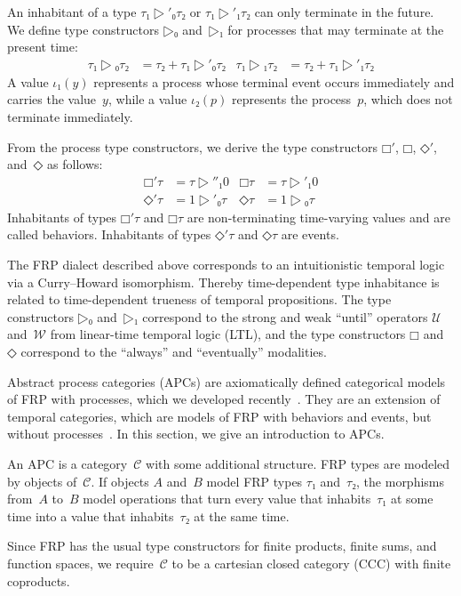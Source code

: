 \documentclass[copyright,creativecommons]{eptcs}
\begin{document}
An inhabitant of a type $τ₁ ▷′₀ τ₂$ or $τ₁ ▷′₁ τ₂$ can only terminate in the
future. We define type constructors $▷₀$ and~$▷₁$ for processes that may
terminate at the present time:
\begin{align}
τ₁ ▷₀ τ₂ & = τ₂ + τ₁ ▷′₀ τ₂ & τ₁ ▷₁ τ₂ & = τ₂ + τ₁ ▷′₁ τ₂
\end{align}
A value $ι₁(y)$ represents a process whose terminal event occurs immediately and
carries the value~$y$, while a value $ι₂(p)$ represents the process~$p$, which
does not terminate immediately.

From the process type constructors, we derive the type constructors $□′$, $□$,
$◇′$, and~$◇$ as follows:
\begin{align}
□′τ & = τ ▷″₁ 0 & □τ & = τ ▷′₁ 0 \\
◇′τ & = 1 ▷′₀ τ & ◇τ & = 1 ▷₀ τ
\end{align}
Inhabitants of types $□′τ$ and $□τ$ are non-terminating time-varying values and
are called behaviors. Inhabitants of types $◇′τ$ and $◇τ$ are events.

The FRP dialect described above corresponds to an intuitionistic temporal logic
via a Curry–Howard isomorphism. Thereby time-dependent type inhabitance is
related to time-dependent trueness of temporal propositions. The type
constructors $▷₀$ and~$▷₁$ correspond to the strong and weak “until” operators
$𝒰$ and~$𝒲$ from linear-time temporal logic (LTL), and the type constructors $□$
and~$◇$ correspond to the “always” and “eventually” modalities.


Abstract process categories (APCs) are axiomatically defined categorical models
of FRP with processes, which we developed recently~\cite{jeltsch:plpv-2014}.
They are an extension of temporal categories, which are models of FRP with
behaviors and events, but without processes~\cite{jeltsch:entcs-286}. In this
section, we give an introduction to APCs.


An APC is a category~$𝒞$ with some additional structure. FRP types are modeled
by objects of~$𝒞$. If objects $A$ and~$B$ model FRP types $τ₁$ and~$τ₂$, the
morphisms from~$A$ to~$B$ model operations that turn every value that
inhabits~$τ₁$ at some time into a value that inhabits~$τ₂$ at the same time.

Since FRP has the usual type constructors for finite products, finite sums, and
function spaces, we require~$𝒞$ to be a cartesian closed category (CCC) with
finite coproducts.
\end{document}
